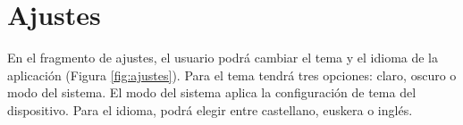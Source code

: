 \documentclass[a4paper,12pt]{report}
\begin{document}
\section{Ajustes}
  En el fragmento de ajustes, el usuario podrá cambiar el tema y el idioma de la aplicación (Figura \ref{fig:ajustes}). Para el tema tendrá tres opciones: claro, oscuro o modo del sistema. El modo del sistema aplica la configuración de tema del dispositivo. Para el idioma, podrá elegir entre castellano, euskera o inglés.

\begin{figure}[htbp]
  \centering

\end{figure}
\end{document}
